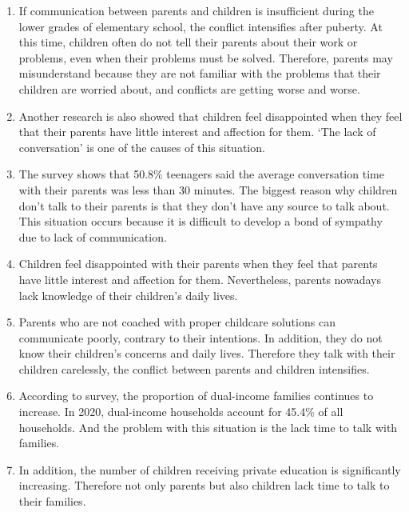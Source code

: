 \documentclass[conference]{IEEEtran}
\begin{document}
\begin{enumerate}
  \item If communication between parents and children is insufficient during the lower grades of elementary school, the conflict intensifies after puberty. At this time, children often do not tell their parents about their work or problems, even when their problems must be solved. Therefore, parents may misunderstand because they are not familiar with the problems that their children are worried about, and conflicts are getting worse and worse.\\
  
  \item Another research is also showed that children feel disappointed when they feel that their parents have little interest and affection for them. ‘The lack of conversation’ is one of the causes of this situation.\\
  
  \item The survey shows that 50.8\% teenagers said the average conversation time with their parents was less than 30 minutes. The biggest reason why children don't talk to their parents is that they don't have any source to talk about. This situation occurs because it is difficult to develop a bond of sympathy due to lack of communication.\\
  
  \item Children feel disappointed with their parents when they feel that parents have little interest and affection for them. Nevertheless, parents nowadays lack knowledge of their children's daily lives.\\

  \item Parents who are not coached with proper childcare solutions can communicate poorly, contrary to their intentions. In addition, they do not know their children's concerns and daily lives. Therefore they talk with their children carelessly, the conflict between parents and children intensifies.\\
  
  \item According to survey, the proportion of dual-income families continues to increase. In 2020, dual-income households account for 45.4\% of all households. And the problem with this situation is the lack time to talk with families.\\
  
  \item In addition, the number of children receiving private education is significantly increasing. Therefore not only parents but also children lack time to talk to their families.
  
\end{enumerate}
\vspace{0.5cm}
\end{document}
